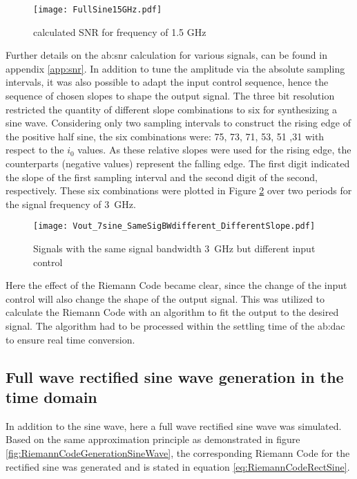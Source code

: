 \begin{figure}[htb]
	\centering
  \texttt{[image: FullSine15GHz.pdf]}
	\caption{calculated SNR for frequency of 1.5 GHz}
	\label{fig:SNRSine1.5GHz}
\end{figure}

Further details on the \gls{ab:snr} calculation for various signals, can be found in appendix \ref{app:snr}.
In addition to tune the amplitude via the absolute sampling intervals, it was also possible to adapt the input control sequence, hence the sequence of chosen slopes to shape the output signal.
The three bit resolution restricted the quantity of different slope combinations to six for synthesizing a sine wave.
Considering only two sampling intervals to construct the rising edge of the positive half sine, the six combinations were: 75, 73, 71, 53, 51 ,31 with respect to the $i_0$ values.
As these relative slopes were used for the rising edge, the counterparts (negative values) represent the falling edge.
The first digit indicated the slope of the first sampling interval and the second digit of the second, respectively. 
These six combinations were plotted in Figure \ref{fig:SameSigBWDifSlope} over two periods for the signal frequency of \SI{3}{\GHz}. 

\begin{figure}[htb!]
	\centering
  \texttt{[image: Vout\_7sine\_SameSigBWdifferent\_DifferentSlope.pdf]}
	\caption{Signals with the same signal bandwidth \SI{3}{\giga \hertz} but different input control}
	\label{fig:SameSigBWDifSlope}
\end{figure}

Here the effect of the Riemann Code became clear, since the change of the input control will also change the shape of the output signal.
This was utilized to calculate the Riemann Code with an algorithm to fit the output to the desired signal.
The algorithm had to be processed within the settling time of the \gls{ab:dac} to ensure real time conversion.

\subsection{Full wave rectified sine wave generation in the time domain}
In addition to the sine wave, here a full wave rectified sine wave was simulated.
Based on the same approximation principle as demonstrated in figure \ref{fig:RiemannCodeGenerationSineWave}, the corresponding Riemann Code for the rectified sine was generated and is stated in equation \ref{eq:RiemannCodeRectSine}.

